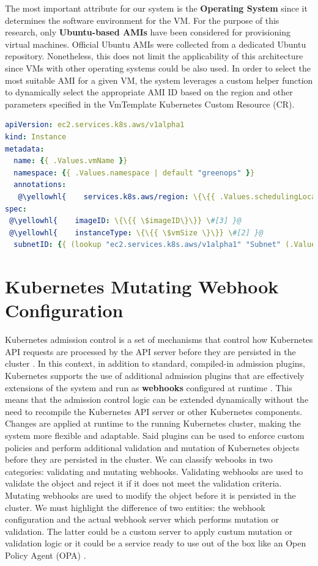 The most important attribute for our system is the \textbf{Operating System} since it determines the software environment for the VM.
For the purpose of this research, only \textbf{Ubuntu-based AMIs} have been considered for provisioning virtual machines. 
Official Ubuntu AMIs were collected from a dedicated Ubuntu repository.
Nonetheless, this does not limit the applicability of this architecture since VMs with other operating systems could be also used.
In order to select the most suitable AMI for a given VM, the system leverages a custom helper function to dynamically select the appropriate AMI ID based on the region and other parameters specified in the VmTemplate Kubernetes Custom Resource (CR).

\begin{lstlisting}[language=yaml, caption={AWS}, label={lst:aws}]
apiVersion: ec2.services.k8s.aws/v1alpha1
kind: Instance
metadata:
  name: {{ .Values.vmName }}
  namespace: {{ .Values.namespace | default "greenops" }}
  annotations:
   @\yellowhl{    services.k8s.aws/region: \{\{{ .Values.schedulingLocation \}\}} \#[1] }@
spec:
 @\yellowhl{    imageID: \{\{{ \$imageID\}\}} \#[3] }@
 @\yellowhl{    instanceType: \{\{{ \$vmSize \}\}} \#[2] }@
  subnetID: {{ (lookup "ec2.services.k8s.aws/v1alpha1" "Subnet" (.Values.namespace | default "greenops") (printf "%s-subnet" .Values.vmName)).status.subnetID }}
\end{lstlisting}

\section{Kubernetes Mutating Webhook Configuration}

Kubernetes admission control is a set of mechanisms that control how Kubernetes API requests are processed by the API server before they are persisted in the cluster \cite{kubernetes_dynamic_admission_control}.
In this context, in addition to standard, compiled-in admission plugins, Kubernetes supports the use of additional admission plugins that are effectively extensions of the system and run as \textbf{webhooks} configured at runtime \cite{kubernetes_dynamic_admission_control}. 
This means that the admission control logic can be extended dynamically without the need to recompile the Kubernetes API server or other Kubernetes components. 
Changes are applied at runtime to the running Kubernetes cluster, making the system more flexible and adaptable.
Said plugins can be used to enforce custom policies and perform additional validation and mutation of Kubernetes objects before they are persisted in the cluster.
We can classify webooks in two categories: validating and mutating webhooks.
Validating webhooks are used to validate the object and reject it if it does not meet the validation criteria.
Mutating webhooks are used to modify the object before it is persisted in the cluster.
We must highlight the difference of two entities: the webhook configuration and the actual webhook server which performs mutation or validation.
The latter could be a custom server to apply custum mutation or validation logic or it could be a service ready to use out of the box like an Open Policy Agent (OPA) \cite{opa_docs}.

